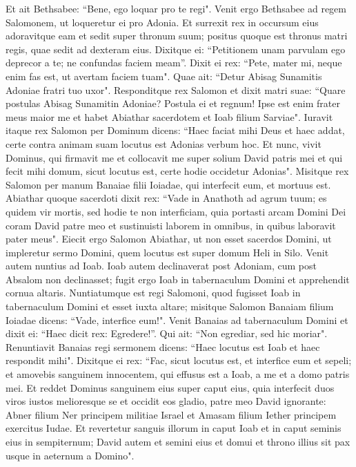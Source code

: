 \begin{biblechapter}
\verse Et ait Bethsabee: “Bene, ego loquar pro te regi". 
\verse Venit ergo Bethsabee ad regem Salomonem, ut loqueretur ei pro Adonia. Et surrexit rex in occursum eius adoravitque eam et sedit super thronum suum; positus quoque est thronus matri regis, quae sedit ad dexteram eius. 
\verse Dixitque ei: “Petitionem unam parvulam ego deprecor a te; ne confundas faciem meam”. Dixit ei rex: “Pete, mater mi, neque enim fas est, ut avertam faciem tuam". 
\verse Quae ait: “Detur Abisag Sunamitis Adoniae fratri tuo uxor". 
\verse Responditque rex Salomon et dixit matri suae: “Quare postulas Abisag Sunamitin Adoniae? Postula ei et regnum! Ipse est enim frater meus maior me et habet Abiathar sacerdotem et Ioab filium Sarviae". 
\verse Iuravit itaque rex Salomon per Dominum dicens: “Haec faciat mihi Deus et haec addat, certe contra animam suam locutus est Adonias verbum hoc. 
\verse Et nunc, vivit Dominus, qui firmavit me et collocavit me super solium David patris mei et qui fecit mihi domum, sicut locutus est, certe hodie occidetur Adonias". 
\verse Misitque rex Salomon per manum Banaiae filii Ioiadae, qui interfecit eum, et mortuus est. 
\verse Abiathar quoque sacerdoti dixit rex: “Vade in Anathoth ad agrum tuum; es quidem vir mortis, sed hodie te non interficiam, quia portasti arcam Domini Dei coram David patre meo et sustinuisti laborem in omnibus, in quibus laboravit pater meus". 
\verse Eiecit ergo Salomon Abiathar, ut non esset sacerdos Domini, ut impleretur sermo Domini, quem locutus est super domum Heli in Silo. 
\verse Venit autem nuntius ad Ioab. Ioab autem declinaverat post Adoniam, cum post Absalom non declinasset; fugit ergo Ioab in tabernaculum Domini et apprehendit cornua altaris. 
\verse Nuntiatumque est regi Salomoni, quod fugisset Ioab in tabernaculum Domini et esset iuxta altare; misitque Salomon Banaiam filium Ioiadae dicens: “Vade, interfice eum!". 
\verse Venit Banaias ad tabernaculum Domini et dixit ei: “Haec dicit rex: Egredere!”. Qui ait: “Non egrediar, sed hic moriar". Renuntiavit Banaias regi sermonem dicens: “Haec locutus est Ioab et haec respondit mihi". 
\verse Dixitque ei rex: “Fac, sicut locutus est, et interfice eum et sepeli; et amovebis sanguinem innocentem, qui effusus est a Ioab, a me et a domo patris mei. 
\verse Et reddet Dominus sanguinem eius super caput eius, quia interfecit duos viros iustos melioresque se et occidit eos gladio, patre meo David ignorante: Abner filium Ner principem militiae Israel et Amasam filium Iether principem exercitus Iudae. 
\verse Et revertetur sanguis illorum in caput Ioab et in caput seminis eius in sempiternum; David autem et semini eius et domui et throno illius sit pax usque in aeternum a Domino".  

\end{biblechapter}
